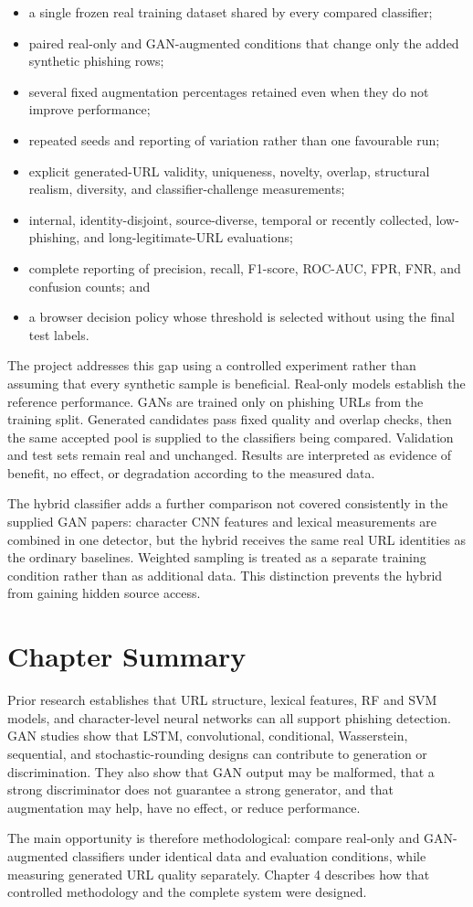 \begin{itemize}
\item a single frozen real training dataset shared by every compared classifier;
\item paired real-only and GAN-augmented conditions that change only the added
synthetic phishing rows;
\item several fixed augmentation percentages retained even when they do not
improve performance;
\item repeated seeds and reporting of variation rather than one favourable run;
\item explicit generated-URL validity, uniqueness, novelty, overlap, structural
realism, diversity, and classifier-challenge measurements;
\item internal, identity-disjoint, source-diverse, temporal or recently
collected, low-phishing, and long-legitimate-URL evaluations;
\item complete reporting of precision, recall, F1-score, ROC-AUC, FPR, FNR, and
confusion counts; and
\item a browser decision policy whose threshold is selected without using the
final test labels.
\end{itemize}

The project addresses this gap using a controlled experiment rather than
assuming that every synthetic sample is beneficial. Real-only models establish
the reference performance. GANs are trained only on phishing URLs from the
training split. Generated candidates pass fixed quality and overlap checks,
then the same accepted pool is supplied to the classifiers being compared.
Validation and test sets remain real and unchanged. Results are interpreted as
evidence of benefit, no effect, or degradation according to the measured data.

The hybrid classifier adds a further comparison not covered consistently in
the supplied GAN papers: character CNN features and lexical measurements are
combined in one detector, but the hybrid receives the same real URL identities
as the ordinary baselines. Weighted sampling is treated as a separate training
condition rather than as additional data. This distinction prevents the hybrid
from gaining hidden source access.

\section{Chapter Summary}

Prior research establishes that URL structure, lexical features, RF and SVM
models, and character-level neural networks can all support phishing detection.
GAN studies show that LSTM, convolutional, conditional, Wasserstein, sequential,
and stochastic-rounding designs can contribute to generation or discrimination.
They also show that GAN output may be malformed, that a
strong discriminator does not guarantee a strong generator, and that
augmentation may help, have no effect, or reduce performance.

The main opportunity is therefore methodological: compare real-only and
GAN-augmented classifiers under identical data and evaluation conditions, while
measuring generated URL quality separately. Chapter 4 describes how that
controlled methodology and the complete system were designed.
